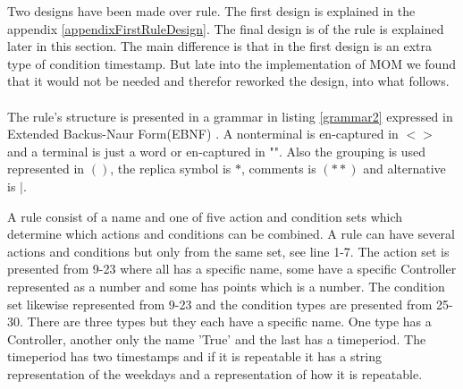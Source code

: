 Two designs have been made over rule. The first design is explained in the appendix \vref{appendixFirstRuleDesign}. The final design is of the rule is explained later in this section. The main difference is that in the first design is an extra type of condition timestamp. But late into the implementation of MOM we found that it would not be needed and therefor reworked the design, into what follows.\\
\\
The rule's structure is presented in a grammar in listing	\ref{grammar2} expressed in Extended Backus-Naur Form(EBNF) \citep{CoPL}.
A nonterminal is en-captured in $<>$ and a terminal is just a word or en-captured in "". 
Also the grouping is used represented in $()$, the replica symbol is $*$, comments is $(**)$ and alternative is $|$. 

A rule consist of a name and one of five action and condition sets which determine which actions and conditions can be combined. A rule can have several actions and conditions but only from the same set, see line 1-7. The action set is presented from 9-23 where all has a specific name, some have a specific Controller represented as a number and some has points which is a number. The condition set likewise represented from 9-23 and the condition types are presented from 25-30. There are three types but they each have a specific name. One type has a Controller, another only the name 'True' and the last has a timeperiod. The timeperiod has two timestamps and if it is repeatable it has a string representation of the weekdays and a representation of how it is repeatable. 

